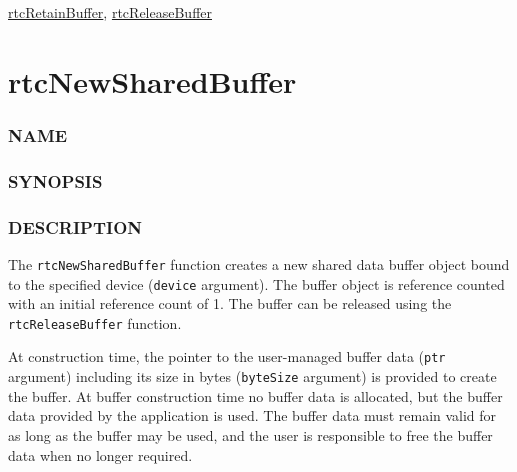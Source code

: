 \hyperref[rtcretainbuffer]{rtcRetainBuffer},
\hyperref[rtcreleasebuffer]{rtcReleaseBuffer}

\pagebreak

\section{rtcNewSharedBuffer}\label{rtcnewsharedbuffer}

\subsubsection{NAME}\label{name}

\begin{Shaded}
\begin{Highlighting}[]
\OperatorTok{{-}}
\end{Highlighting}
\end{Shaded}

\subsubsection{SYNOPSIS}\label{synopsis}

\begin{Shaded}
\begin{Highlighting}[]

\OperatorTok{(}
\OperatorTok{,}
  \OperatorTok{*}\OperatorTok{,}
\OperatorTok{);}
\end{Highlighting}
\end{Shaded}

\subsubsection{DESCRIPTION}\label{description}

The \texttt{rtcNewSharedBuffer} function creates a new shared data
buffer object bound to the specified device (\texttt{device} argument).
The buffer object is reference counted with an initial reference count
of 1. The buffer can be released using the \texttt{rtcReleaseBuffer}
function.

At construction time, the pointer to the user-managed buffer data
(\texttt{ptr} argument) including its size in bytes (\texttt{byteSize}
argument) is provided to create the buffer. At buffer construction time
no buffer data is allocated, but the buffer data provided by the
application is used. The buffer data must remain valid for as long as
the buffer may be used, and the user is responsible to free the buffer
data when no longer required.

